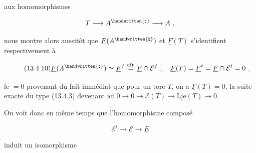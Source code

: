 
aux homomorphismes

\[
T\longrightarrow A^{\handwritten{\natural}}\longrightarrow A\ ,
\]

nous montre alors aussitôt que $\underline{F}(A^{\handwritten{\natural}})$ et $\underline{F}(T)$ s'identifient respectivement à

\[
\tag*{(13.4.10)}
\underline{F}(A^{\handwritten{\natural}})\simeq\underline{F}^{f}\overset{\mathrm{dfn}}{=}\underline{F}\cap\mathcal{E}^{f}\ ,\quad \underline{F}(T)=\underline{F}^{t}=\underline{F}\cap\mathcal{E}^{t}=0\ ,
\]

le $=0$ provenant du fait immédiat que pour un tore $T$, on a $\underline{F}(T)=0$, la suite exacte du type (13.4.3) devenant ici $0\to0\to\mathcal{E}(T)\to\underline{\mathrm{Lie}}(T)\to0$.

On voit donc en même temps que l'homomorphisme composé

\[
\mathcal{E}^{t}\longrightarrow\mathcal{E}\longrightarrow\underline{E}
\]

induit un isomorphisme



